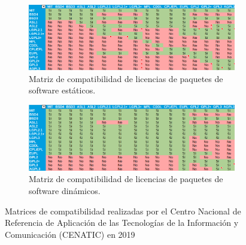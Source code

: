 \begin{figure}[h!]
\centering
\begin{subfigure}{\linewidth}
\includegraphics[scale=.5]{imagenes/matriz-estatica.eps}
\caption{Matriz de compatibilidad de licencias de paquetes de software estáticos.}
\end{subfigure}
\begin{subfigure}{\linewidth}
\includegraphics[scale=.5]{imagenes/matriz-dinamica.eps}
\caption{Matriz de compatibilidad de licencias de paquetes de software dinámicos.}
\end{subfigure}
\caption{Matrices de compatibilidad realizadas por el Centro Nacional de Referencia de Aplicación de las Tecnologías de la Información y Comunicación (CENATIC) en 2019}
\label{figMatriz}
\end{figure}



